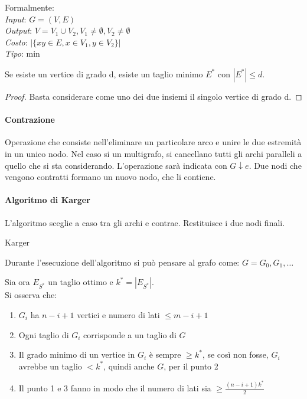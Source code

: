 Formalmente:\\
\emph{Input}: $G=(V,E)$\\
\emph{Output}: $V = V_1 \cup V_2, V_1 \neq \emptyset, V_2 \neq \emptyset$\\
\emph{Costo}: $|\{xy \in E, x \in V_1, y \in V_2\}|$\\
\emph{Tipo}: min

\begin{lemma}
    Se esiste un vertice di grado d, esiste un taglio minimo $E^*$ con $|E^*| \leq d$.
\end{lemma}
\begin{proof}
    Basta considerare come uno dei due insiemi il singolo vertice di grado d.
\end{proof}

\paragraph{Contrazione}
Operazione che consiste nell'eliminare un particolare arco e unire le due estremità in un unico nodo.
Nel caso si un multigrafo, si cancellano tutti gli archi paralleli a quello che si sta considerando.
L'operazione sarà indicata con $G \downarrow e$. Due nodi che vengono contratti formano un nuovo 
nodo, che li contiene.

\paragraph{Algoritmo di Karger}
L'algoritmo sceglie a caso tra gli archi e contrae.
Restituisce i due nodi finali.

\begin{algorithm}[H]
    \SetAlgoLined
     \caption{Karger}
\end{algorithm}

Durante l'esecuzione dell'algoritmo si può pensare al grafo come: $G = G_0, G_1, \dots$

\begin{remark}
    \label{osskarg}
    Sia ora $E_{S^*}$ un taglio ottimo e $k^* = |E_{S^*}|$.\\
    Si osserva che: 
    \begin{enumerate}
        \item $G_i$ ha $n-i+1$ vertici e numero di lati $\leq m-i +1$ 
        \item Ogni taglio di $G_i$ corrisponde a un taglio di $G$
        \item Il grado minimo di un vertice in $G_i$ è sempre $\geq k^*$, se così non fosse, 
        $G_i$ avrebbe un taglio $< k^*$, quindi anche $G$, per il punto 2
        \item Il punto 1 e 3 fanno in modo che il numero di lati sia $\geq \frac{(n-i+1)k^*}{2}$
    \end{enumerate}    
\end{remark}

